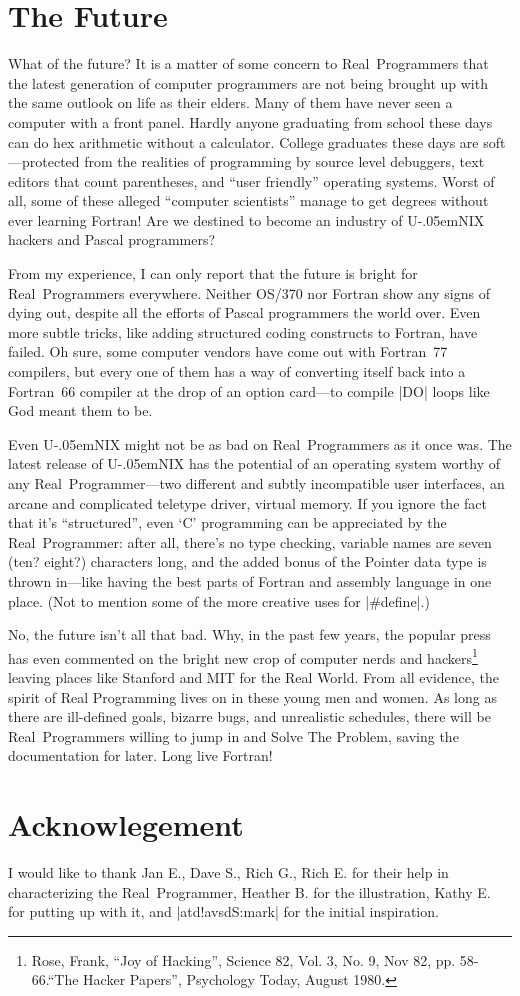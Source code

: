 \documentclass[10pt,letterpaper]{article}
\newcommand{\acro}[1]{{\small #1\spacefactor1000}}
\def\UNIX/{{\small U\kern-.05emNIX\spacefactor1000}}%
\begin{document}
\section*{The Future}
What of the future? It is a matter of some concern to Real~Programmers
that the latest generation of computer programmers are not being
brought up with the same outlook on life as their elders. Many of them
have never seen a computer with a front panel. Hardly anyone
graduating from school these days can do hex arithmetic without a
calculator. College graduates these days are soft---protected from the
realities of programming by source level debuggers, text editors that
count parentheses, and ``user friendly'' operating systems. Worst of
all, some of these alleged ``computer scientists'' manage to get degrees
without ever learning Fortran! Are we destined to become an industry
of \UNIX/ hackers and Pascal programmers?

From my experience, I can only report that the future is bright for
Real~Programmers everywhere. Neither \acro{OS/370} nor Fortran show any signs
of dying out, despite all the efforts of Pascal programmers the
world over. Even more subtle tricks, like adding structured coding
constructs to Fortran, have failed. Oh sure, some computer vendors
have come out with Fortran~77 compilers, but every one of them has a
way of converting itself back into a Fortran~66 compiler at the drop
of an option card---to compile |DO| loops like God meant them to be.

Even \UNIX/ might not be as bad on Real~Programmers as it once was. The
latest release of \UNIX/ has the potential of an operating system worthy
of any Real~Programmer---two different and subtly incompatible user
interfaces, an arcane and complicated teletype driver, virtual
memory. If you ignore the fact that it's ``structured'', even `\acro{C}'
programming can be appreciated by the Real~Programmer: after all,
there's no type checking, variable names are seven (ten? eight?)
characters long, and the added bonus of the Pointer data type is
thrown in---like having the best parts of Fortran and assembly
language in one place. (Not to mention some of the more creative uses
for |\#define|.)

No, the future isn't all that bad. Why, in the past few years, the
popular press has even commented on the bright new crop of computer
nerds and hackers\footnote{%
Rose, Frank, ``Joy of Hacking'', Science 82, Vol. 3, No. 9, Nov 82, pp. 58-66.\hfil\break ``The Hacker Papers'', Psychology Today, August 1980.} leaving
places like Stanford and \acro{MIT}
for the Real World. From all evidence, the spirit of Real Programming
lives on in these young men and women. As long as there are
ill-defined goals, bizarre bugs, and unrealistic schedules, there will
be Real~Programmers willing to jump in and Solve The Problem, saving
the documentation for later. Long live Fortran!

\section*{Acknowlegement}
I would like to thank Jan E., Dave S., Rich G., Rich E. for their help
in characterizing the Real~Programmer, Heather B. for the
illustration, Kathy E. for putting up with it, and |atd!avsdS:mark| for
the initial inspiration.
\end{document}
